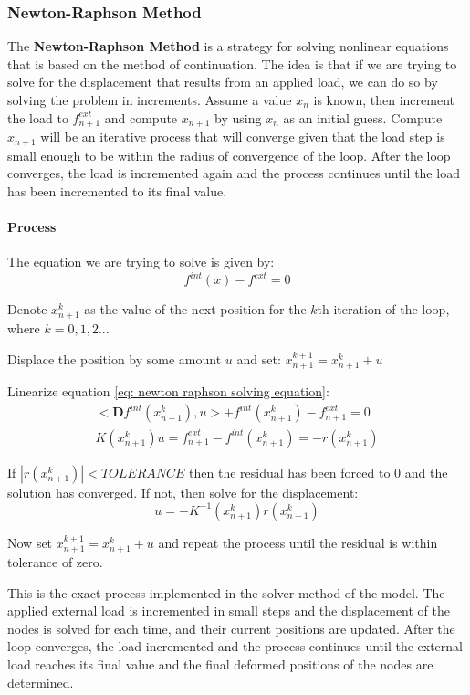 \documentclass[]{spie}  %
\begin{document}
\subsubsection{Newton-Raphson Method}
The \textbf{Newton-Raphson Method} is a strategy for solving nonlinear equations that is based on the method of continuation. The idea is that if we are trying to solve for the displacement that results from an applied load, we can do so by solving the problem in increments. Assume a value $x_n$ is known, then increment the load to $f^{ext}_{n+1}$ and compute $x_{n+1}$ by using $x_n$ as an initial guess. Compute $x_{n+1}$ will be an iterative process that will converge given that the load step is small enough to be within the radius of convergence of the loop. After the loop converges, the load is incremented again and the process continues until the load has been incremented to its final value. 

\paragraph{Process}
The equation we are trying to solve is given by:
\begin{equation}
\label{eq: newton raphson solving equation}
f^{int}(x) - f^{ext} = 0
\end{equation}

Denote $x^k_{n+1}$ as the value of the next position for the $k$th iteration of the loop, where $k = 0,1,2...$ 

Displace the position by some amount $u$ and set: $x^{k+1}_{n+1} = x^k_{n+1} + u$

Linearize equation \ref{eq: newton raphson solving equation}: 
\begin{gather}
<\bm{D} f^{int}(x^k_{n+1}), u> + f^{int}(x^k_{n+1}) - f^{ext}_{n+1} = 0 \\
K(x^k_{n+1})u = f^{ext}_{n+1} - f^{int}(x^k_{n+1}) = -r(x^k_{n+1}) 
\end{gather}

If $|r(x^k_{n+1})| < TOLERANCE $ then the residual has been forced to 0 and the solution has converged. If not, then solve for the displacement:
\begin{equation}
u = -K^{-1}(x^k_{n+1}) r(x^k_{n+1})
\end{equation}

Now set $ x^{k+1}_{n+1} = x^k_{n+1} + u $ and repeat the process until the residual is within tolerance of zero. 

This is the exact process implemented in the solver method of the model. The applied external load is incremented in small steps and the displacement of the nodes is solved for each time, and their current positions are updated. After the loop converges, the load incremented and the process continues until the external load reaches its final value and the final deformed positions of the nodes are determined. 
\end{document}
